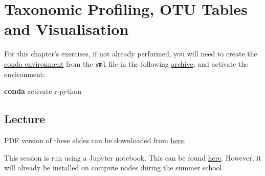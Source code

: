 \documentclass[
  letterpaper,
]{book}
\newenvironment{Shaded}{}{}
\newcommand{\ExtensionTok}[1]{\textcolor[rgb]{0.84,0.23,0.29}{\textbf{#1}}}
\newcommand{\NormalTok}[1]{\textcolor[rgb]{0.14,0.16,0.18}{#1}}
\begin{document}
\hypertarget{taxonomic-profiling-otu-tables-and-visualisation}{%
\chapter{Taxonomic Profiling, OTU Tables and
Visualisation}\label{taxonomic-profiling-otu-tables-and-visualisation}}

\begin{tcolorbox}[enhanced jigsaw, opacitybacktitle=0.6, bottomtitle=1mm, opacityback=0, colback=white, coltitle=black, leftrule=.75mm, toprule=.15mm, title=\textcolor{quarto-callout-tip-color}{\faLightbulb}\hspace{0.5em}{Tip}, colframe=quarto-callout-tip-color-frame, toptitle=1mm, arc=.35mm, left=2mm, titlerule=0mm, breakable, rightrule=.15mm, bottomrule=.15mm, colbacktitle=quarto-callout-tip-color!10!white]

For this chapter's exercises, if not already performed, you will need to
create the \protect\hyperlink{creating-a-conda-environment}{conda
environment} from the \texttt{yml} file in the following
\href{https://doi.org/10.5281/zenodo.6983165}{archive}, and activate the
environment:

\begin{Shaded}
\begin{Highlighting}[]
\ExtensionTok{conda}\NormalTok{ activate r{-}python}
\end{Highlighting}
\end{Shaded}

\end{tcolorbox}

\hypertarget{lecture-9}{%
\section{Lecture}\label{lecture-9}}

PDF version of these slides can be downloaded from
\href{https://github.com/SPAAM-community/wss-summer-school/raw/main/docs/assets/slides/2022/3c-intro-to-taxprofiling/SPAAM\%20Summer\%20School\%202022\%20-\%203C\%20-\%20Intro\%20to\%20microbial\%20ecology\%20for\%20ancient\%20DNA.pdf}{here}.

This session is run using a Jupyter notebook. This can be found
\href{https://github.com/maxibor/microbiome_tutorial}{here}. However, it
will already be installed on compute nodes during the summer school.
\end{document}
